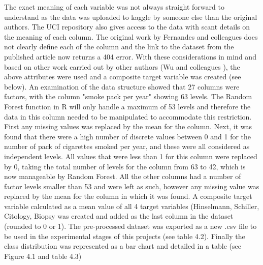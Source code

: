 The exact meaning of each variable was not always straight forward to understand as the data was uploaded to kaggle by someone else than the original authors. The UCI repository also gives access to the data with scant details on the meaning of each column. The original work by Fernandes and colleagues \citep{Fernandes:2017td} does not clearly define each of the column and the link to the dataset from the published article now returns a 404 error. With these considerations in mind and based on other work carried out by other authors (Wu and colleagues \citep{Wu:2017fa}), the above attributes were used and a composite target variable was created (see below).\newline
An examination of the data structure showed that 27 columns were factors, with the column "smoke pack per year" showing 63 levels. The Random Forest function in R will only handle a maximum of 53 levels and therefore the data in this column needed to be manipulated to accommodate this restriction. \newline
First any missing values was replaced by the mean for the column. Next, it was found that there were a high number of discrete values between 0 and 1 for the number of pack of cigarettes smoked per year, and these were all considered as independent levels. All values that were less than 1 for this column were replaced by 0, taking the total number of levels for the column from 63 to 42, which is now manageable by Random Forest.\newline
All the other columns had a number of factor levels smaller than 53 and were left as such, however any missing value was replaced by the mean for the column in which it was found.\newline
A composite target variable calculated as a mean value of all 4 target variables (Hinselmann, Schiller, Citology, Biopsy was created and added as the last column in the dataset (rounded to 0 or 1).\newline
The pre-processed dataset was exported as a new .csv file to be used in the experimental stages of this projects (see table 4.2).
Finally the class distribution was represented as a bar chart and detailed in a table (see Figure 4.1 and table 4.3) 

